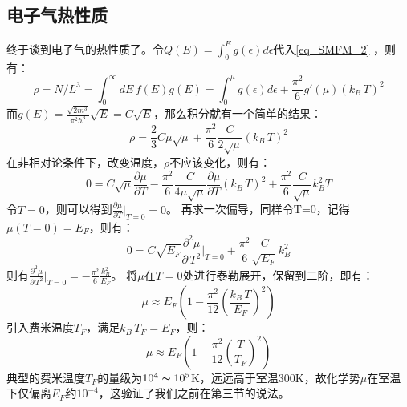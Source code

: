 \subsection{电子气热性质}
终于谈到电子气的热性质了。令$Q(E)=\int_0^{E} g(\epsilon)d\epsilon$代入\autoref{eq_SMFM_2} ，则有：
\begin{equation}
\rho=N/L^3=\int_0^{\infty} dE\,f(E)g(E)=\int_0^{\mu} g(\epsilon)d\epsilon+\frac{\pi^2}{6}g'(\mu)(k_B\,T)^2
\end{equation}
而$g(E)=\frac{\sqrt{2m^3}}{\pi^2\hbar^3}\sqrt{E}=C\sqrt{E}$，那么积分就有一个简单的结果：
\begin{equation}
\rho=\frac{2}{3}C\mu\sqrt{\mu}+\frac{\pi^2}{6}\frac{C}{2\sqrt{\mu}}(k_B\,T)^2
\end{equation}
在非相对论条件下，改变温度，$\rho$不应该变化，则有：
\begin{equation}
0=C\sqrt{\mu}\frac{\partial \mu}{\partial T} -\frac{\pi^2}{6}\frac{C}{4\mu\sqrt{\mu}}\frac{\partial \mu}{\partial T}(k_B\,T)^2+\frac{\pi^2}{6}\frac{C}{\sqrt{\mu}}k_B^2  T
\end{equation}
令$T=0$，则可以得到$\frac{\partial \mu}{\partial T}\bigg|_{T=0}=0$。
再求一次偏导，同样令T=0，记得$\mu(T=0)=E_F$，则有：
\begin{equation}
0=C\sqrt{E_F}\frac{\partial ^2\mu}{\partial\, T^2}\bigg|_{T=0}+\frac{\pi^2}{6}\frac{C}{\sqrt{E_F}}k_B^2
\end{equation}
则有$\frac{\partial ^2\mu}{\partial\, T^2}\bigg|_{T=0}=-\frac{\pi^2}{6}\frac{k_B^2}{E_F}$。
将$\mu$在$T=0$处进行泰勒展开，保留到二阶，即有：
\begin{equation}
\mu\approx E_F\left(1-\frac{\pi^2}{12}(\frac{k_B\,T}{E_F})^2\right)
\end{equation}
引入费米温度$T_F$，满足$k_B\,T_F=E_F$，则：
\begin{equation}\label{eq_SMFM_3}
\mu\approx E_F\left(1-\frac{\pi^2}{12}(\frac{T}{T_F})^2\right)
\end{equation}
典型的费米温度$T_F$的量级为$10^4\thicksim 10^5$K，远远高于室温300K，故化学势$\mu$在室温下仅偏离$E_F$约$10^{-4}$，这验证了我们之前在第三节的说法。

